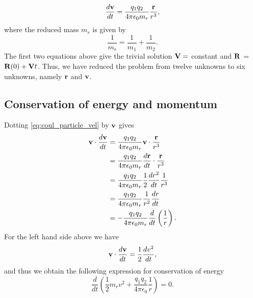 \documentclass[a4paper,11pt]{report}
\begin{document}
\begin{equation}
    \label{eq:coul_particle_vel}
    \frac{d \mathbf{v}}{dt} = \frac{q_1 q_2}{4\pi \epsilon_0 m_r} \frac{\mathbf{r}}{r^3},
\end{equation}
where the reduced mass $m_r$ is given by
\begin{equation}
    \label{eq:coul_reduced_mass}
    \frac{1}{m_r} = \frac{1}{m_1} + \frac{1}{m_2}.
\end{equation}
The first two equations above give the trivial solution $\mathbf{V} = $ constant and $\mathbf{R}$ = $\mathbf{R}(0) + \mathbf{V} t$. Thus, we have reduced the problem from twelve unknowns to six unknowns, namely $\mathbf{r}$ and $\mathbf{v}$.

\subsection{Conservation of energy and momentum}
Dotting \cref{eq:coul_particle_vel} by $\mathbf{v}$ gives 
\begin{align*}
    \mathbf{v} \cdot \frac{d \mathbf{v}}{dt} &= \frac{q_1 q_2}{4 \pi \epsilon_0 m_r} \mathbf{v} \cdot \frac{\mathbf{r}}{r^3} \nonumber \\
    &= \frac{q_1 q_2}{4 \pi \epsilon_0 m_r} \frac{d\mathbf{r}}{dt} \cdot \frac{\mathbf{r}}{r^3} \nonumber \\
    &= \frac{q_1 q_2}{4 \pi \epsilon_0 m_r} \frac{1}{2} \frac{dr^2}{dt} \frac{1}{r^3} \nonumber \\
    &= \frac{q_1 q_2}{4 \pi \epsilon_0 m_r} \frac{1}{r^2} \frac{dr}{dt} \nonumber \\
    &= -\frac{q_1 q_2}{4 \pi \epsilon_0 m_r} \frac{d}{dt} \left ( \frac{1}{r} \right ).
\end{align*} 
For the left hand side above we have
\begin{equation*}
    \mathbf{v} \cdot \frac{d \mathbf{v}}{dt} = \frac{1}{2} \frac{d v^2}{dt},
\end{equation*}
and thus we obtain the following expression for conservation of energy
\begin{equation*}
    \frac{d}{dt} \left ( \frac{1}{2} m_r v^2 + \frac{q_1 q_2}{4 \pi \epsilon_0} \frac{1}{r} \right ) = 0.
\end{equation*}
\end{document}

